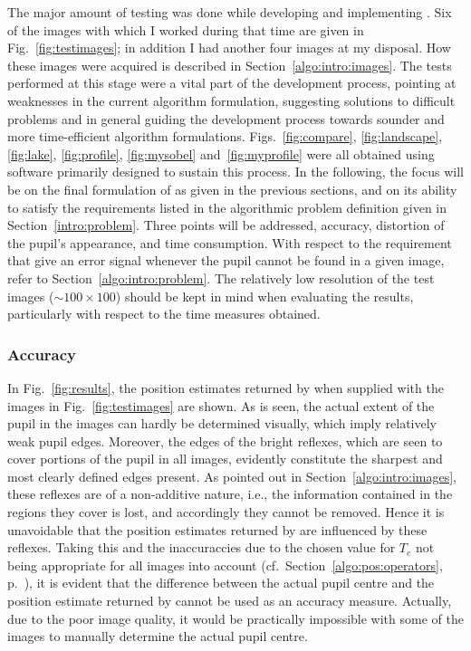 The major amount of testing was done while developing and implementing
{\octopus}.  Six of the images with which I worked during that time
are given in Fig.~\ref{fig:testimages}; in addition I had another four
images at my disposal.  How these images were acquired is described in
Section~\ref{algo:intro:images}.  The tests performed at this stage
were a vital part of the development process, pointing at weaknesses
in the current algorithm formulation, suggesting solutions to
difficult problems and in general guiding the development process
towards sounder and more time-efficient algorithm formulations.
Figs.~\ref{fig:compare}, \ref{fig:landscape}, \ref{fig:lake},
\ref{fig:profile}, \ref{fig:mysobel} and~\ref{fig:myprofile} were all
obtained using software primarily designed to sustain this process.
In the following, the focus will be on the final formulation of
{\octopus} as given in the previous sections, and on its ability to
satisfy the requirements listed in the algorithmic problem definition
given in Section~\ref{intro:problem}.  Three points will be addressed,
accuracy, distortion of the pupil's appearance, and time consumption.
With respect to the requirement that {\octopus} give an error signal
whenever the pupil cannot be found in a given image, refer to
Section~\ref{algo:intro:problem}.  The relatively low resolution of
the test images ($\sim 100\times 100$) should be kept in mind when
evaluating the results, particularly with respect to the time measures
obtained.

\subsubsection{Accuracy}

In Fig.~\ref{fig:results}, the position estimates returned by
{\octopus} when supplied with the images in Fig.~\ref{fig:testimages}
are shown.  As is seen, the actual extent of the pupil in the images
can hardly be determined visually, which imply relatively weak pupil
edges.  Moreover, the edges of the bright reflexes, which are seen to
cover portions of the pupil in all images, evidently constitute the
sharpest and most clearly defined edges present.  As pointed out in
Section~\ref{algo:intro:images}, these reflexes are of a non-additive
nature, i.e., the information contained in the regions they cover is
lost, and accordingly they cannot be removed.  Hence it is unavoidable
that the position estimates returned by {\octopus} are influenced by
these reflexes.  Taking this and the inaccuraccies due to the chosen
value for $T_{e}$ not being appropriate for all images into account
(cf.\ Section~\ref{algo:pos:operators}, p.~\pageref{pg:TEproblems}),
it is evident that the difference between the actual pupil centre and
the position estimate returned by {\octopus} cannot be used as an
accuracy measure.  Actually, due to the poor image quality, it would
be practically impossible with some of the images to manually
determine the actual pupil centre.

